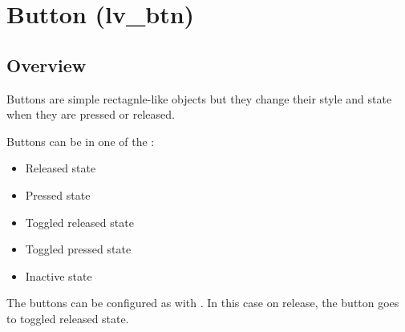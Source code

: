 \documentclass[letterpaper,10pt,english]{sphinxmanual}
\begin{document}
\begin{fulllineitems}

\begin{fulllineitems}
\label{\detokenize{object-types/bar:_CPPv4N12lv_bar_ext_t11style_indicE}}%
\pysigstartmultiline
{}%
\pysigstopmultiline
\end{fulllineitems}


\end{fulllineitems}



\section{Button (lv\_btn)}
\label{\detokenize{object-types/btn:button-lv-btn}}\label{\detokenize{object-types/btn::doc}}

\subsection{Overview}
\label{\detokenize{object-types/btn:overview}}
Buttons are simple rectagnle-like objects but they change their style and state when they are pressed or released.

Buttons can be in one of the :
\begin{itemize}
\item {} 
 Released state

\item {} 
 Pressed state

\item {} 
 Toggled released state

\item {} 
 Toggled pressed state

\item {} 
 Inactive state

\end{itemize}

The buttons can be configured as  with . In this case on release, the button goes to toggled released state.
\end{document}
